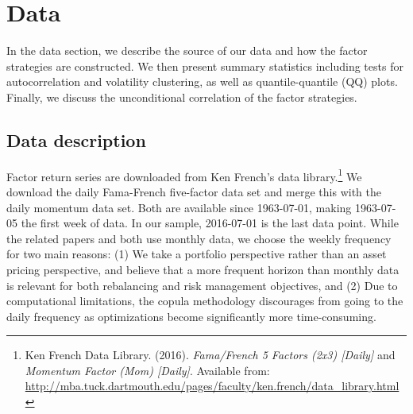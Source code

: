 \section{Data}
\label{sec:data}
In the data section, we describe the source of our data and how the factor strategies are constructed. We then present summary statistics including tests for autocorrelation and volatility clustering, as well as quantile-quantile (QQ) plots. Finally, we discuss the unconditional correlation of the factor strategies.

\subsection{Data description}

Factor return series are downloaded from Ken French's data library.\footnote{Ken French Data Library. (2016). \textit{Fama/French 5 Factors (2x3) [Daily]} and \textit{Momentum Factor (Mom) [Daily]}. Available from: \url{http://mba.tuck.dartmouth.edu/pages/faculty/ken.french/data_library.html}} We download the daily Fama-French five-factor data set and merge this with the daily momentum data set. Both are available since 1963-07-01, making 1963-07-05 the first week of data. In our sample, 2016-07-01 is the last data point. While the related papers \textcite{FF2015} and \textcite{Asness2015} both use monthly data, we choose the weekly frequency for two main reasons: (1) We take a portfolio perspective rather than an asset pricing perspective, and believe that a more frequent horizon than monthly data is relevant for both rebalancing and risk management objectives, and (2) Due to computational limitations, the copula methodology discourages from going to the daily frequency as optimizations become significantly more time-consuming.

